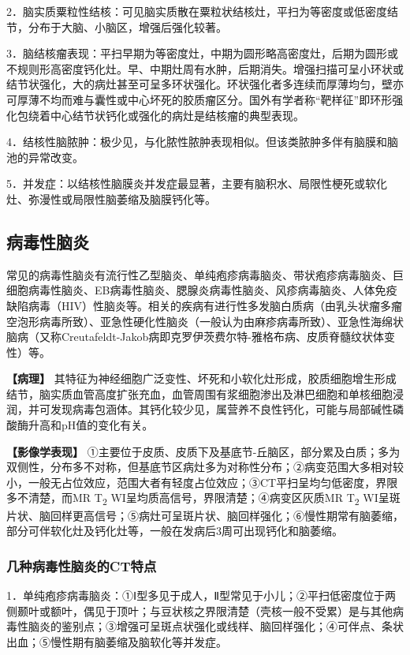 2．脑实质粟粒性结核：可见脑实质散在粟粒状结核灶，平扫为等密度或低密度结节，分布于大脑、小脑区，增强后强化较著。

3．脑结核瘤表现：平扫早期为等密度灶，中期为圆形略高密度灶，后期为圆形或不规则形高密度钙化灶。早、中期灶周有水肿，后期消失。增强扫描可呈小环状或结节状强化，大的病灶甚至可呈多环状强化。环状强化者多连续而厚薄均匀，壁亦可厚薄不均而难与囊性或中心坏死的胶质瘤区分。国外有学者称“靶样征”即环形强化包绕着中心结节状钙化或强化的病灶是结核瘤的典型表现。

4．结核性脑脓肿：极少见，与化脓性脓肿表现相似。但该类脓肿多伴有脑膜和脑池的异常改变。

5．并发症：以结核性脑膜炎并发症最显著，主要有脑积水、局限性梗死或软化灶、弥漫性或局限性脑萎缩及脑膜钙化等。

\subsection{病毒性脑炎}

常见的病毒性脑炎有流行性乙型脑炎、单纯疱疹病毒脑炎、带状疱疹病毒脑炎、巨细胞病毒性脑炎、EB病毒性脑炎、腮腺炎病毒性脑炎、风疹病毒脑炎、人体免疫缺陷病毒（HIV）性脑炎等。相关的疾病有进行性多发脑白质病（由乳头状瘤多瘤空泡形病毒所致）、亚急性硬化性脑炎（一般认为由麻疹病毒所致）、亚急性海绵状脑病（又称Creutafeldt-Jakob病即克罗伊茨费尔特-雅格布病、皮质脊髓纹状体变性）等。

\textbf{【病理】}
其特征为神经细胞广泛变性、坏死和小软化灶形成，胶质细胞增生形成结节，脑实质血管高度扩张充血，血管周围有浆细胞渗出及淋巴细胞和单核细胞浸润，并可发现病毒包涵体。其钙化较少见，属营养不良性钙化，可能与局部碱性磷酸酶升高和pH值的变化有关。

\textbf{【影像学表现】}
①主要位于皮质、皮质下及基底节-丘脑区，部分累及白质；多为双侧性，分布多不对称，但基底节区病灶多为对称性分布；②病变范围大多相对较小，一般无占位效应，范围大者有轻度占位效应；③CT平扫呈均匀低密度，界限多不清楚，而MR
T\textsubscript{2} WI呈均质高信号，界限清楚；④病变区灰质MR
T\textsubscript{2}
WI呈斑片状、脑回样更高信号；⑤病灶可呈斑片状、脑回样强化；⑥慢性期常有脑萎缩，部分可伴软化灶及钙化灶等，一般在发病后3周可出现钙化和脑萎缩。

\subsubsection{几种病毒性脑炎的CT特点}

1．单纯疱疹病毒脑炎：①Ⅰ型多见于成人，Ⅱ型常见于小儿；②平扫低密度位于两侧颞叶或额叶，偶见于顶叶；与豆状核之界限清楚（壳核一般不受累）是与其他病毒性脑炎的鉴别点；③增强可呈斑点状强化或线样、脑回样强化；④可伴点、条状出血；⑤慢性期有脑萎缩及脑软化等并发症。

